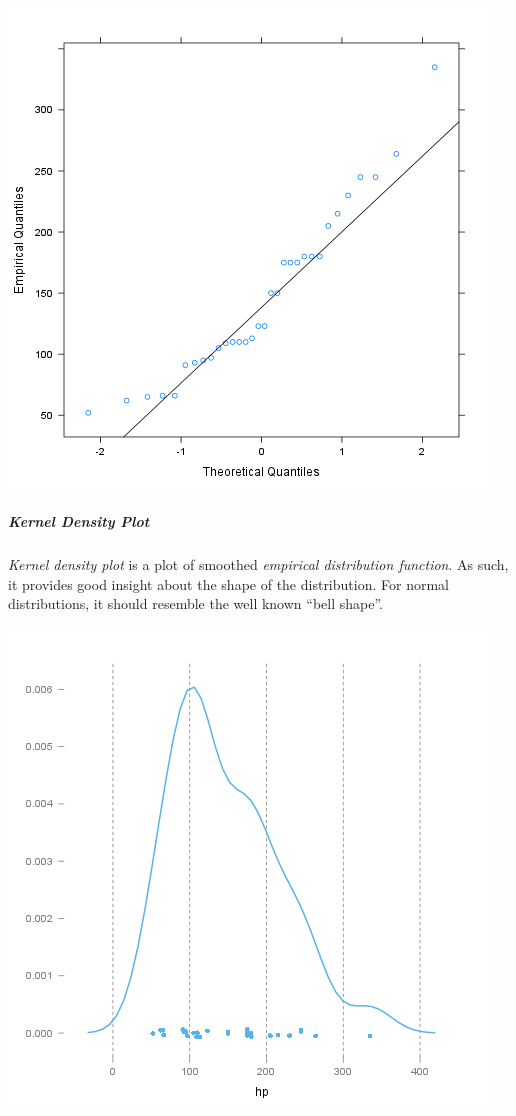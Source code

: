 \documentclass[]{article}
\makeatletter
\def\maxwidth{\ifdim\Gin@nat@width>\linewidth\linewidth
\else\Gin@nat@width\fi}
\let\Oldincludegraphics\includegraphics
\renewcommand{\includegraphics}[1]{\Oldincludegraphics[width=\maxwidth]{#1}}
\makeatother
\begin{document}
\href{/tmp/RtmpeIwHkw/file584ddd86-hires.png}{\includegraphics{1cefec04e4451a937a5c6aa4dfdcb352.png}}

\subparagraph{Kernel Density Plot}

\emph{Kernel density plot} is a plot of smoothed \emph{empirical
distribution function}. As such, it provides good insight about the
shape of the distribution. For normal distributions, it should resemble
the well known ``bell shape''.

\href{/tmp/RtmpeIwHkw/file38a3f274-hires.png}{\includegraphics{9d1aa0141cbe00d3fc38daa10e0ee295.png}}
\end{document}
